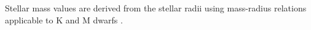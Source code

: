 \documentclass[modern]{aastex63}
\newcommand\kepler{\emph{Kepler}}
\begin{document}
Stellar mass values are derived from the stellar radii using mass-radius relations applicable to K and M dwarfs
\citep{boyajian12}.



\end{document}
